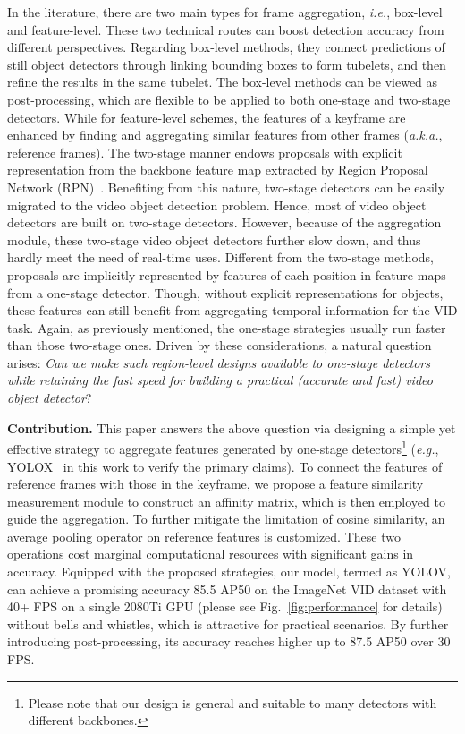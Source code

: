 \documentclass[letterpaper]{article} \usepackage{aaai23}  \usepackage{times}  \usepackage{helvet}  \usepackage{courier}  \usepackage[hyphens]{url}  \usepackage{graphicx} \urlstyle{rm} \def\UrlFont{\rm}  \usepackage{natbib}  \usepackage{caption} \usepackage{xcolor}
\begin{document}
In the literature, there are two main types for frame aggregation, \emph{i.e.}, box-level and feature-level. These two technical routes can boost detection accuracy from different perspectives. Regarding box-level methods, they connect predictions of still object detectors through linking bounding boxes to form tubelets, and then refine the results in the same tubelet. 
The box-level methods can be viewed as post-processing, which are flexible to be applied to both one-stage and two-stage detectors. While for feature-level schemes, the features of a keyframe are enhanced by finding and aggregating similar features from other frames (\emph{a.k.a.}, reference frames). The two-stage manner endows proposals with explicit representation from the backbone feature map extracted by Region Proposal Network (RPN)~\cite{ren2015faster}. Benefiting from this nature, two-stage detectors can be easily migrated to the video object detection problem. Hence, most of video object detectors are built on two-stage detectors. However, because of the aggregation module, these two-stage video object detectors further slow down, and thus hardly meet the need of real-time uses. 
Different from the two-stage methods, proposals are implicitly represented by features of each position in feature maps from a one-stage detector. Though, without explicit representations for objects, these features can still benefit from aggregating temporal information for the VID task. Again, as previously mentioned, the one-stage strategies usually run faster than those two-stage ones. Driven by these considerations, a natural question arises: \emph{Can we make such region-level designs available to one-stage detectors while retaining the fast speed for building a practical (accurate and fast) video object detector}? 

\noindent
\textbf{Contribution.} This paper answers the above question via designing a simple yet effective strategy to aggregate features generated by one-stage detectors\footnote{Please note that our design is general and suitable to many detectors with different backbones.} (\emph{e.g.}, YOLOX~\cite{ge2021yolox} in this work to verify the primary claims). To connect the features of reference frames with those in the keyframe, we propose a feature similarity measurement module to construct an affinity matrix, which is then employed to guide the aggregation. To further mitigate the limitation of cosine similarity, an average pooling operator on reference features is customized. These two operations cost marginal computational resources with significant gains in accuracy. Equipped with the proposed strategies, our model, termed as YOLOV, can achieve a promising accuracy 85.5 AP50 on the ImageNet VID dataset with 40+ FPS on a single 2080Ti GPU (please see Fig.~\ref{fig:performance} for details) without bells and whistles, which is attractive for practical scenarios. By further introducing post-processing, its accuracy reaches higher up to 87.5 AP50 over 30 FPS.
\end{document}
